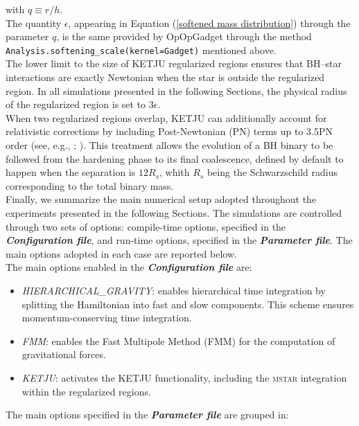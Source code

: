 \documentclass[12pt,twoside,openany]{book}
\begin{document}
with $q\equiv r/h$.\\The quantity $\epsilon$, appearing in Equation (\ref{softened mass distribution}) through the parameter $q$, is the same provided by OpOpGadget through the method \texttt{Analysis.softening\_scale(kernel=Gadget)} mentioned above.\\The lower limit to the size of KETJU regularized regions ensures that BH--star interactions are exactly Newtonian when the star is outside the regularized region. In all simulations presented in the following Sections, the physical radius of the regularized region is set to $3\epsilon$.\\When two regularized regions overlap, KETJU can additionally account for relativistic corrections by including Post-Newtonian (PN) terms up to 3.5PN order (see, e.g., \citealt{Thorne_1985}; \citealt{Blanchet_2014}). This treatment allows the evolution of a BH binary to be followed from the hardening phase to its final coalescence, defined by default to happen when the separation is $12R_s$, whith $R_s$ being the Schwarzschild radius corresponding to the total binary mass.\\Finally, we summarize the main numerical setup adopted throughout the experiments presented in the following Sections. The simulations are controlled through two sets of options: compile-time options, specified in the \textbf{\emph{Configuration file}}, and run-time options, specified in the \textbf{\emph{Parameter file}}. The main options adopted in each case are reported below.\\The main options enabled in the \textbf{\emph{Configuration file}} are:
\begin{itemize}
    \item \textit{HIERARCHICAL\_GRAVITY}: enables hierarchical time integration by
    splitting the Hamiltonian into fast and slow components. This scheme ensures
    momentum-conserving time integration.

    \item \textit{FMM}: enables the Fast Multipole Method (FMM) for the computation
    of gravitational forces.

    \item \textit{KETJU}: activates the KETJU functionality, including the
    \textsc{mstar} integration within the regularized regions.
\end{itemize}
The main options specified in the \textbf{\emph{Parameter file}} are grouped in:
\end{document}
